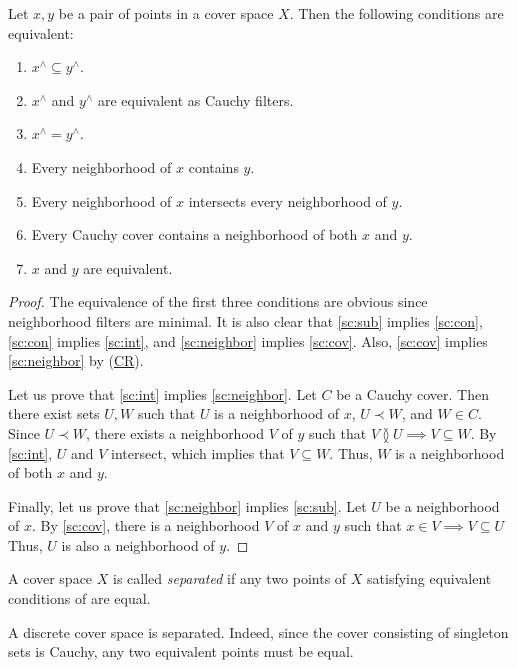 \documentclass[reqno]{amsart}
\newcommand{\axref}[1]{(\hyperref[ax:#1]{#1})}
\theoremstyle{definition}
\theoremstyle{remark}
\numberwithin{figure}{section}
\newcommand{\overlap}[2]{#1 \between #2}
\newcommand{\rb}{\prec}
\begin{document}
\begin{lem}
Let $x,y$ be a pair of points in a cover space $X$.
Then the following conditions are equivalent:
\begin{enumerate}
\item \label{sc:sub} $x^\wedge \subseteq y^\wedge$.
\item $x^\wedge$ and $y^\wedge$ are equivalent as Cauchy filters.
\item $x^\wedge = y^\wedge$.
\item \label{sc:con} Every neighborhood of $x$ contains $y$.
\item \label{sc:int} Every neighborhood of $x$ intersects every neighborhood of $y$.
\item \label{sc:neighbor} Every Cauchy cover contains a neighborhood of both $x$ and $y$.
\item \label{sc:cov} $x$ and $y$ are equivalent.
\end{enumerate}
\end{lem}
\begin{proof}
The equivalence of the first three conditions are obvious since neighborhood filters are minimal.
It is also clear that \eqref{sc:sub} implies \eqref{sc:con}, \eqref{sc:con} implies \eqref{sc:int}, and \eqref{sc:neighbor} implies \eqref{sc:cov}.
Also, \eqref{sc:cov} implies \eqref{sc:neighbor} by \axref{CR}.

Let us prove that \eqref{sc:int} implies \eqref{sc:neighbor}.
Let $C$ be a Cauchy cover.
Then there exist sets $U,W$ such that $U$ is a neighborhood of $x$, $U \rb W$, and $W \in C$.
Since $U \rb W$, there exists a neighborhood $V$ of $y$ such that $\overlap{V}{U} \implies V \subseteq W$.
By \eqref{sc:int}, $U$ and $V$ intersect, which implies that $V \subseteq W$.
Thus, $W$ is a neighborhood of both $x$ and $y$.

Finally, let us prove that \eqref{sc:neighbor} implies \eqref{sc:sub}.
Let $U$ be a neighborhood of $x$.
By \eqref{sc:cov}, there is a neighborhood $V$ of $x$ and $y$ such that $x \in V \implies V \subseteq U$
Thus, $U$ is also a neighborhood of $y$.
\end{proof}

\begin{defn}
A cover space $X$ is called \emph{separated} if any two points of $X$ satisfying equivalent conditions of  are equal.
\end{defn}

\begin{example}
A discrete cover space is separated.
Indeed, since the cover consisting of singleton sets is Cauchy, any two equivalent points must be equal.
\end{example}
\end{document}
